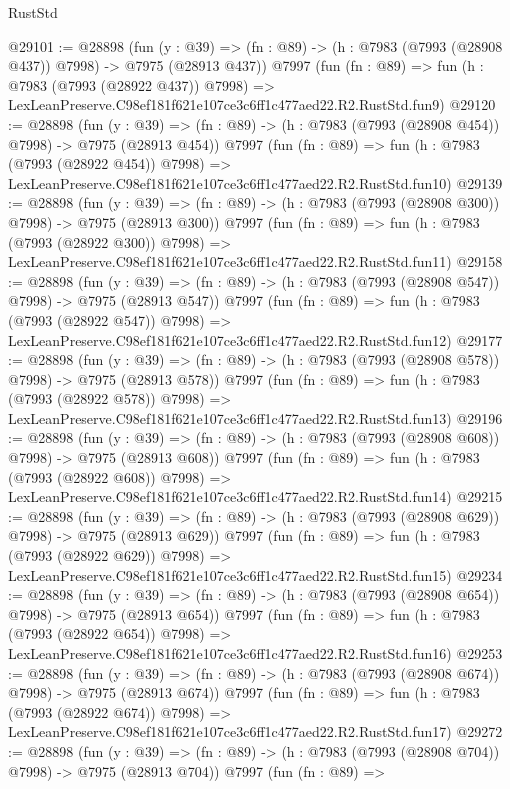 \begin{lexlean}{RustStd}
\begin{coremodule}
@29101 := @28898
    (fun (y : @39) => (fn : @89) -> (h : @7983 (@7993 (@28908 @437)) @7998) -> @7975 (@28913 @437))
    @7997
    (fun (fn : @89) =>
    fun (h : @7983 (@7993 (@28922 @437)) @7998) =>
    LexLeanPreserve.C98ef181f621e107ce3c6ff1c477aed22.R2.RustStd.fun9)
@29120 := @28898
    (fun (y : @39) => (fn : @89) -> (h : @7983 (@7993 (@28908 @454)) @7998) -> @7975 (@28913 @454))
    @7997
    (fun (fn : @89) =>
    fun (h : @7983 (@7993 (@28922 @454)) @7998) =>
    LexLeanPreserve.C98ef181f621e107ce3c6ff1c477aed22.R2.RustStd.fun10)
@29139 := @28898
    (fun (y : @39) => (fn : @89) -> (h : @7983 (@7993 (@28908 @300)) @7998) -> @7975 (@28913 @300))
    @7997
    (fun (fn : @89) =>
    fun (h : @7983 (@7993 (@28922 @300)) @7998) =>
    LexLeanPreserve.C98ef181f621e107ce3c6ff1c477aed22.R2.RustStd.fun11)
@29158 := @28898
    (fun (y : @39) => (fn : @89) -> (h : @7983 (@7993 (@28908 @547)) @7998) -> @7975 (@28913 @547))
    @7997
    (fun (fn : @89) =>
    fun (h : @7983 (@7993 (@28922 @547)) @7998) =>
    LexLeanPreserve.C98ef181f621e107ce3c6ff1c477aed22.R2.RustStd.fun12)
@29177 := @28898
    (fun (y : @39) => (fn : @89) -> (h : @7983 (@7993 (@28908 @578)) @7998) -> @7975 (@28913 @578))
    @7997
    (fun (fn : @89) =>
    fun (h : @7983 (@7993 (@28922 @578)) @7998) =>
    LexLeanPreserve.C98ef181f621e107ce3c6ff1c477aed22.R2.RustStd.fun13)
@29196 := @28898
    (fun (y : @39) => (fn : @89) -> (h : @7983 (@7993 (@28908 @608)) @7998) -> @7975 (@28913 @608))
    @7997
    (fun (fn : @89) =>
    fun (h : @7983 (@7993 (@28922 @608)) @7998) =>
    LexLeanPreserve.C98ef181f621e107ce3c6ff1c477aed22.R2.RustStd.fun14)
@29215 := @28898
    (fun (y : @39) => (fn : @89) -> (h : @7983 (@7993 (@28908 @629)) @7998) -> @7975 (@28913 @629))
    @7997
    (fun (fn : @89) =>
    fun (h : @7983 (@7993 (@28922 @629)) @7998) =>
    LexLeanPreserve.C98ef181f621e107ce3c6ff1c477aed22.R2.RustStd.fun15)
@29234 := @28898
    (fun (y : @39) => (fn : @89) -> (h : @7983 (@7993 (@28908 @654)) @7998) -> @7975 (@28913 @654))
    @7997
    (fun (fn : @89) =>
    fun (h : @7983 (@7993 (@28922 @654)) @7998) =>
    LexLeanPreserve.C98ef181f621e107ce3c6ff1c477aed22.R2.RustStd.fun16)
@29253 := @28898
    (fun (y : @39) => (fn : @89) -> (h : @7983 (@7993 (@28908 @674)) @7998) -> @7975 (@28913 @674))
    @7997
    (fun (fn : @89) =>
    fun (h : @7983 (@7993 (@28922 @674)) @7998) =>
    LexLeanPreserve.C98ef181f621e107ce3c6ff1c477aed22.R2.RustStd.fun17)
@29272 := @28898
    (fun (y : @39) => (fn : @89) -> (h : @7983 (@7993 (@28908 @704)) @7998) -> @7975 (@28913 @704))
    @7997
    (fun (fn : @89) =>

\end{coremodule}
\end{lexlean}
